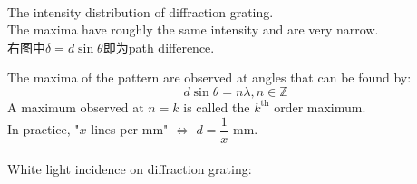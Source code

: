 \begin{center}
  \\
  The intensity distribution of diffraction grating. \\The maxima have roughly the same intensity and are very narrow.\\
  右图中$\delta=d\sin\theta$即为path difference.
\end{center}
The maxima of the pattern are observed at angles that can be found by:
\[d\sin\theta=n\lambda, n\in\mathbb{Z}\]
A maximum observed at $n=k$ is called the $k^\text{th}$ order maximum.\\
In practice, "$x$ lines per mm" $\Leftrightarrow$ $d=\dfrac{1}{x}$ mm.\\\\
White light incidence on diffraction grating:
